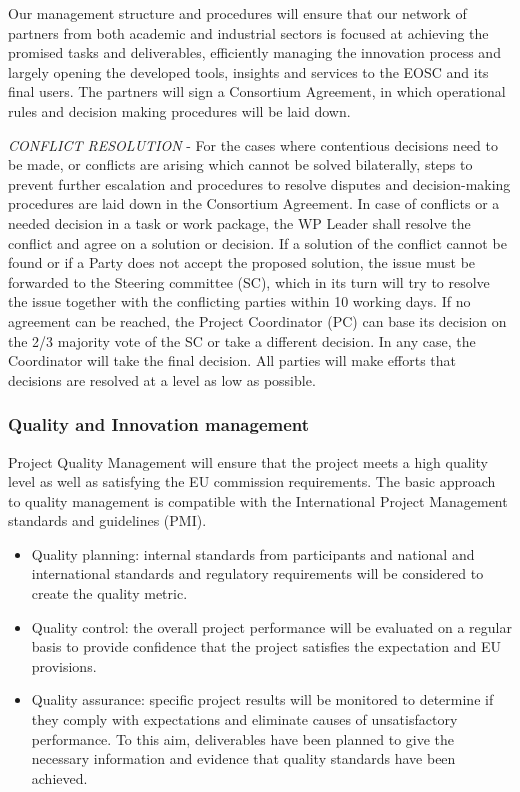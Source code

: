 Our management structure and procedures will ensure that our network
of partners from both academic and industrial sectors is focused at
achieving the promised tasks and deliverables, efficiently managing
the innovation process and largely opening the developed tools,
insights and services to the EOSC and its final users.
The partners will sign a Consortium Agreement, in which operational
rules and decision making procedures will be laid down.

\emph{CONFLICT RESOLUTION} - For the cases where contentious decisions
need to be made, or conflicts are arising which cannot be solved bilaterally,
steps to prevent further escalation and procedures to resolve disputes
and decision-making procedures are laid down in the Consortium Agreement.
In case of conflicts or a needed decision in a task or work package,
the WP Leader shall resolve the conflict and agree on a solution or decision.
If a solution of the conflict cannot be found or if a Party does not accept
the proposed solution, the issue must be forwarded to the Steering committee (SC),
which in its turn will try to resolve the issue together with the conflicting parties
within 10 working days. If no agreement can be reached, the Project Coordinator (PC) can
base its decision on the 2/3 majority vote of the SC or take a different decision.
In any case, the Coordinator will take the final decision. All parties will make
efforts that decisions are resolved at a level as low as possible.

\subsubsection{Quality and Innovation management}

\TheProject Project Quality Management will ensure that
the project meets a high quality level as well as satisfying the EU commission
requirements. The basic approach to quality management is compatible with the
International Project Management standards and guidelines (PMI).

\begin{itemize}
\item Quality planning: internal standards from participants and national and international standards and
regulatory requirements will be considered to create the quality metric.
\item Quality control: the overall project performance will be evaluated on a regular basis to provide
confidence that the project satisfies the expectation and EU provisions.
\item Quality assurance: specific project results will be monitored to determine if they comply with
expectations and eliminate causes of unsatisfactory performance. To this aim, deliverables have been
planned to give the necessary information and evidence that quality standards have been achieved.
\end{itemize}

